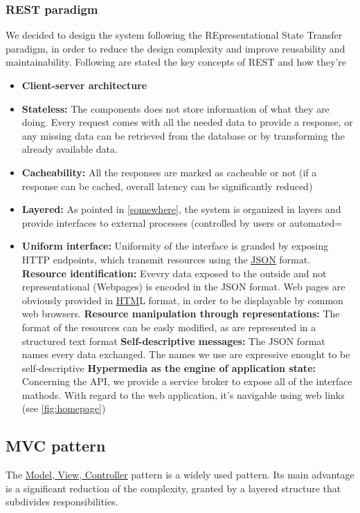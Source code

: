 \documentclass{article}
\newcommand{\link}[2]{{\color{blue}\underline{\href{#1}{#2}}}}
\begin{document}
		\subsubsection{REST paradigm}
			We decided to design the system following the REpresentational State Transfer paradigm, 				in order to reduce the design complexity and improve reusability and maintainability.
			Following are stated the key concepts of REST and how they're 
			\begin{itemize}
				\item \textbf{Client-server architecture}
				\item \textbf{Stateless:} 
					The components does not store information of what they are doing. Every request comes with all the needed data to
					provide a response, or any missing data can be retrieved from the database or by transforming the already available
					data.
				\item \textbf{Cacheability:} 
					All the responses are marked as cacheable or not (if a response can be cached, overall 
					latency can be significantly reduced)
				\item \textbf{Layered:} 
					As pointed in \ref{somewhere}, the system is organized in layers and provide
					interfaces to external processes (controlled by users or automated=
				\item \textbf{Uniform interface:} 
					Uniformity of the interface is granded by exposing HTTP endpoints, which transmit resources using
					the \link{https://json.org/json-en.html}{JSON} format.
					\subitem \textbf{Resource identification:} 
						Evevry data exposed to the outside and not representational (Webpages) is 
						encoded in the JSON format. Web pages are obviously provided in 
						\link{https://en.wikipedia.org/wiki/HTML}{HTM}L format, in order to be displayable by
						common web browsers.
					\subitem \textbf{Resource manipulation through representations:}
						The format of the resources can be easly modified, as are represented
						in a structured text format
					\subitem \textbf{Self-descriptive messages:}
						The JSON format names every data exchanged. The names we use are
						expressive enought to be self-descriptive
					\subitem \textbf{Hypermedia as the engine of application state:}
						Concerning the API, we provide a service broker to expose all of the
						interface mathods. With regard to the web application, it's navigable 
						using web links (see \ref{fig:homepage})
			\end{itemize}
		\subsection{MVC pattern}
			The \link{https://en.wikipedia.org/wiki/Model-view-controller}{Model, View, Controller} pattern is a widely 
			used pattern. Its main advantage is a significant reduction of the complexity, granted by a layered
			structure that subdivides responsibilities.
\end{document}
